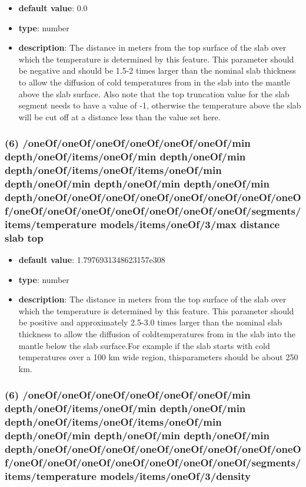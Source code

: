 \begin{itemize}[leftmargin=6em]\item {\bf default value}: 0.0
\item {\bf type}: number
\item {\bf description}: The distance in meters from the top surface of the slab over which the temperature is determined by this feature. This parameter should be negative and should be 1.5-2 times larger than the nominal slab thickness to allow the diffusion of cold temperatures from in the slab into the mantle above the slab surface. Also note that the top truncation value for the slab segment needs to have a value of -1, otherwise the temperature above the slab will be cut off at a distance less than the value set here.
\end{itemize}\subsubsection{(6) /oneOf/oneOf/oneOf/oneOf/oneOf/oneOf/min depth/oneOf/items/oneOf/min depth/oneOf/min depth/oneOf/items/oneOf/items/oneOf/min depth/oneOf/min depth/oneOf/min depth/oneOf/min depth/oneOf/oneOf/oneOf/oneOf/oneOf/oneOf/oneOf/oneOf/oneOf/oneOf/oneOf/oneOf/oneOf/oneOf/oneOf/segments/items/temperature models/items/oneOf/3/max distance slab top}
\begin{itemize}[leftmargin=6em]\item {\bf default value}: 1.7976931348623157e308
\item {\bf type}: number
\item {\bf description}: The distance in meters from the top surface of the slab over which the temperature is determined by this feature. This parameter should be positive and approximately 2.5-3.0 times larger than the nominal slab thickness to allow the diffusion of coldtemperatures from in the slab into the mantle below the slab surface.For example if the slab starts with cold temperatures over a 100 km wide region, thisparameters should be about 250 km.
\end{itemize}\subsubsection{(6) /oneOf/oneOf/oneOf/oneOf/oneOf/oneOf/min depth/oneOf/items/oneOf/min depth/oneOf/min depth/oneOf/items/oneOf/items/oneOf/min depth/oneOf/min depth/oneOf/min depth/oneOf/min depth/oneOf/oneOf/oneOf/oneOf/oneOf/oneOf/oneOf/oneOf/oneOf/oneOf/oneOf/oneOf/oneOf/oneOf/oneOf/segments/items/temperature models/items/oneOf/3/density}
